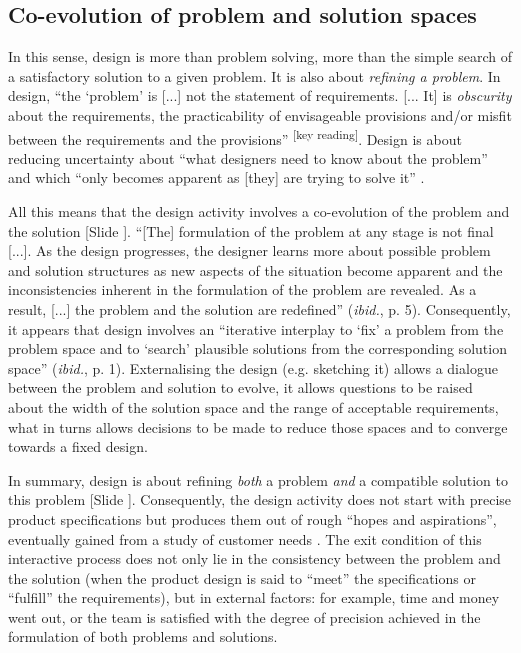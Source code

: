 \documentclass{article}
\newcounter{slide}
\begin{document}
\subsection{Co-evolution of problem and solution spaces}
\label{sec:coevolution}
In this sense, design is more than problem solving, more than the simple search of a satisfactory solution to a given problem. It is also about \emph{refining a problem}. In design, ``the `problem' is [...] not the statement of requirements. [... It] is \emph{obscurity} about the requirements, the practicability of envisageable provisions and/or misfit between the requirements and the provisions'' \cite[emphasis is not in the original text]{archerDesignDiscipline1979}\textsuperscript{\color{Magenta}[key reading]}. Design is about reducing uncertainty about ``what designers need to know about the problem'' and which ``only becomes apparent as [they] are trying to solve it'' \cite{crossDesignThinkingUnderstanding2011a}. 

All this means that the design activity involves a co-evolution of the problem and the solution {\color{blue}[Slide ]}\cite{maherFormalisingDesignExploration1996}. ``[The] formulation of the problem at any stage is not final [...]. As the design progresses, the designer learns more about possible problem and solution structures as new aspects of the situation become apparent and the inconsistencies inherent in the formulation of the problem are revealed. As a result, [...] the problem and the solution are redefined'' (\emph{ibid.}, p. 5). Consequently, it appears that design involves an ``iterative interplay to `fix' a problem from the problem space and to `search' plausible solutions from the corresponding solution space'' (\emph{ibid.}, p. 1). Externalising the design (e.g. sketching it) allows a dialogue between the problem and solution to evolve, it allows questions to be raised about the width of the solution space and the range of acceptable requirements, what in turns allows decisions to be made to reduce those spaces and to converge towards a fixed design. 

In summary, design is about refining \emph{both} a problem \emph{and} a compatible solution to this problem {\color{blue}[Slide ]}. Consequently, the design activity does not start with precise product specifications but produces them out of rough ``hopes and aspirations'', eventually gained from a study of customer needs \cite[p. 73]{ulrichProductDesignDevelopment2011}. The exit condition of this interactive process does not only lie in the consistency between the problem and the solution (when the product design is said to ``meet'' the specifications or ``fulfill'' the requirements), but in external factors: for example, time and money went out, or the team is satisfied with the degree of precision achieved in the formulation of both problems and solutions. 
\end{document}
